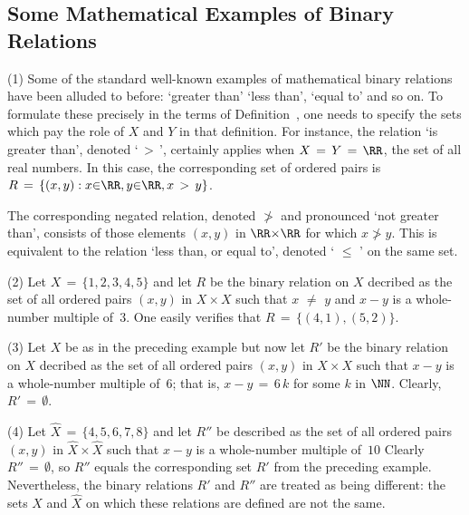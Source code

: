         \subsection{\small{{\bf Some Mathematical Examples of Binary Relations}}}
        \label{ExampA12.65B}

\V

        (1) Some of the standard well-known examples of mathematical binary relations have been alluded to before:
    `greater than' `less than', `equal to' and so on. To formulate these precisely in the terms of Definition~,
    one needs to specify the sets which pay the role of $X$ and $Y$ in that definition.
    For instance, the relation `is greater than', denoted `$\,>\,$', certainly applies when $X \,=\, Y \,=\, {\RR}$, the set of all real numbers.
    In this case, the corresponding set of ordered pairs is $R \,=\, \{(x,y): x{\in}{\RR}, y{\in}{\RR}, x\,>\,y\}$.

        The corresponding negated relation, denoted $\not>$ and pronounced `not greater than',
    consists of those elements $(x,y)$ in ${\RR}{\times}{\RR}$ for which $x\not>y$.
    This is equivalent to the relation `less than, or equal to', denoted 	`$\,\,{\leq}\,\,$' on the same set.

\V

        (2) Let $X \,=\, \{1,2,3,4,5\}$ and let $R$ be the binary relation on $X$ decribed as the set of all ordered pairs $(x,y)$ in $X{\times}X$
    such that $x \,\,{\neq}\,\, y$ and $x-y$ is a whole-number multiple of~$3$. One easily verifies that $R \,=\, \{(4,1), (5,2)\}$.

\V

        (3) Let $X$ be as in the preceding example but now let $R'$ be the binary relation on $X$
    decribed as the set of all ordered pairs $(x,y)$ in $X{\times}X$ such that $x-y$ is a whole-number multiple of~$6$;
    that is, $x-y \,=\, 6\,k$ for some $k$ in ${\NN}$. Clearly, $R' \,=\, {\emptyset}$.

\V

        (4) Let $\hat{X} \,=\, \{4, 5, 6, 7, 8\}$ and let $R''$ be described as the set of all ordered pairs $(x,y)$ in $\hat{X}{\times}\hat{X}$ such that $x-y$ is a whole-number multiple of~$10$
    Clearly $R'' \,=\,{\emptyset}$, so $R''$ equals the corresponding set $R'$ from the preceding example.
    Nevertheless, the binary relations $R'$ and $R''$ are treated as being different:
    the sets $X$ and $\hat{X}$ on which these relations are defined are not the same.




